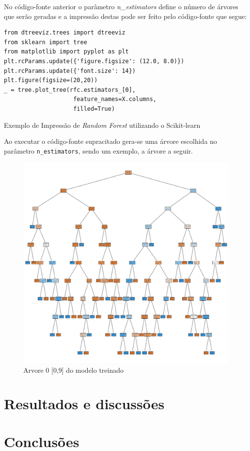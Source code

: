 \documentclass{article}
\begin{document}
No código-fonte anterior o parâmetro \textit{n\_estimators} define o número de árvores que serão geradas e a impressão destas pode ser feito pelo código-fonte que segue:

\begin{listing}[H]
\begin{verbatim}
from dtreeviz.trees import dtreeviz
from sklearn import tree
from matplotlib import pyplot as plt
plt.rcParams.update({'figure.figsize': (12.0, 8.0)})
plt.rcParams.update({'font.size': 14})
plt.figure(figsize=(20,20))
_ = tree.plot_tree(rfc.estimators_[0], 
                    feature_names=X.columns,
                    filled=True)
\end{verbatim}
\caption{Exemplo de Impressão de \emph{Random Forest} utilizando o Scikit-learn}
\end{listing}

Ao executar o código-fonte supracitado gera-se uma árvore escolhida no parâmetro \texttt{n\_estimators}, sendo um exemplo, a árvore a seguir. 

\begin{figure}[H]
\centering
\includegraphics[width=1\textwidth]{tree_0.png}
\caption{Arvore 0 [0,9] do modelo treinado}
\label{Tree}
\end{figure}

\section{Resultados e discussões}

\section{Conclusões}
		


 
\end{document}
